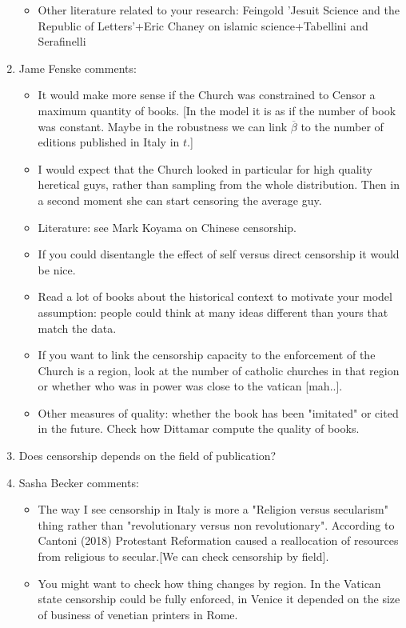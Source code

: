 \documentclass[12pt]{article}
\begin{document}
\begin{enumerate}
\begin{itemize}
\item Other literature related to your research: Feingold 'Jesuit Science and the Republic of Letters'+Eric Chaney on islamic science+Tabellini and Serafinelli
\end{itemize}
\item Jame Fenske comments:
\begin{itemize}
\item It would make more sense if the Church was constrained to Censor a maximum quantity of books. [In the model it is as if the number of book was constant. Maybe in the robustness we can link $ \overline{\beta}$ to the number of editions published in Italy in $t$.]
\item I would expect that the Church looked in particular for high quality heretical guys, rather than sampling from the whole distribution. Then in a second moment she can start censoring the average guy.
\item Literature: see Mark Koyama on Chinese censorship.
\item If you could disentangle the effect of self versus direct censorship it would be nice.
\item Read a lot of books about the historical context to motivate your model assumption: people could think at many ideas different than yours that match the data.
\item If you want to link the censorship capacity to the enforcement of the Church is a region, look at the number of catholic churches in that region or whether who was in power was close to the vatican [mah..].
\item Other measures of quality: whether the book has been "imitated" or cited in the future. Check how Dittamar compute the quality of books.
\end{itemize}
\item Does censorship depends on the field of publication?
\item Sasha Becker comments:
\begin{itemize}
\item The way I see censorship in Italy is more a "Religion versus secularism" thing rather than "revolutionary versus non revolutionary". According to Cantoni (2018) Protestant Reformation caused a reallocation of resources from religious to secular.[We can check censorship by field].
\item You might want to check how thing changes by region. In the Vatican state censorship could be fully enforced, in Venice it depended on the size of business of venetian printers in Rome.
\end{itemize}

\end{enumerate}
\end{document}
